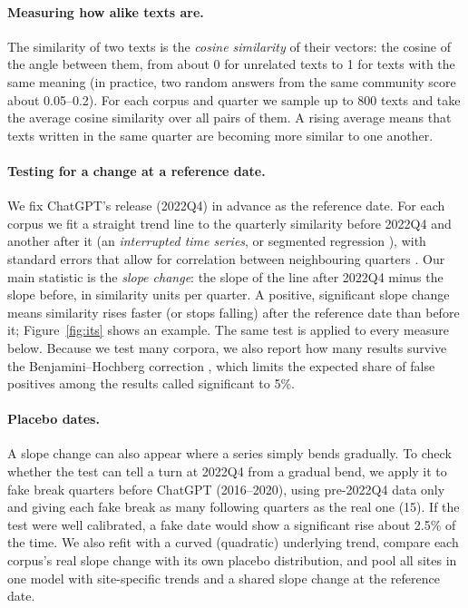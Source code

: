 \documentclass[11pt]{article}
\begin{document}
\paragraph{Measuring how alike texts are.} The similarity of two texts is the \emph{cosine
similarity} of their vectors: the cosine of the angle between them, from about 0 for unrelated
texts to 1 for texts with the same meaning (in practice, two random answers from the same community
score about 0.05--0.2). For each corpus and quarter we sample up to 800 texts and take the average
cosine similarity over all pairs of them. A rising average means that texts written in the same
quarter are becoming more similar to one another.

\paragraph{Testing for a change at a reference date.} We fix ChatGPT's release (2022Q4) in
advance as the reference date. For each corpus we fit a straight trend line to the
quarterly similarity before 2022Q4 and another after it (an \emph{interrupted time series}, or
segmented regression \citep{wagner2002}), with standard errors that allow for correlation between
neighbouring quarters \citep{newey1987}. Our main statistic is the \emph{slope change}: the slope of
the line after 2022Q4 minus the slope before, in similarity units per quarter. A positive, significant
slope change means similarity rises faster (or stops falling) after the reference date than before it;
Figure~\ref{fig:its} shows an example. The same test is applied to every measure below. Because we
test many corpora, we also report how many results survive the Benjamini--Hochberg correction
\citep{benjamini1995}, which limits the expected share of false positives among the results called
significant to 5\%.

\paragraph{Placebo dates.} A slope change can also appear where a series simply bends gradually.
To check whether the test can tell a turn at 2022Q4 from a gradual bend, we apply it to fake break
quarters before ChatGPT (2016--2020), using pre-2022Q4 data only and giving each fake break as many
following quarters as the real one (15). If the test were well calibrated, a fake date would show a
significant rise about 2.5\% of the time. We also refit with a curved (quadratic) underlying trend,
compare each corpus's real slope change with its own placebo distribution, and pool all sites in
one model with site-specific trends and a shared slope change at the reference date.
\end{document}
